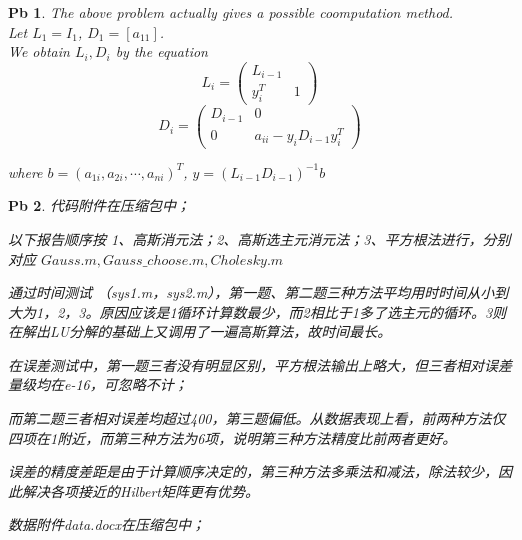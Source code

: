 \documentclass[a4paper,10pt]{article}
\newtheorem{num}{Pb}
\begin{document}
\begin{num}
    The above problem actually gives a possible coomputation method.\\
    Let  $ L_1=I_1 $, $ D_1=[a_{11}] $.\\
    We obtain  $ L_i,D_i $ by the equation 
    \[
        L_i=\begin{pmatrix}
            L_{i-1}&\\
            y_i^T&1
        \end{pmatrix}
    \]   
    \begin{equation*}
        D_i=\begin{pmatrix}
            D_{i-1}&0\\0&a_{ii}-y_iD_{i-1}y_i^T
        \end{pmatrix}
    \end{equation*}

    where  $  b=(a_{1i},a_{2i},\cdots,a_{ni})^T $, $ y=(L_{i-1}D_{i-1})^{-1}b $  
\end{num}
\begin{num}
    代码附件在压缩包中；
    
    
    以下报告顺序按 1、高斯消元法；2、高斯选主元消元法；3、平方根法进行，分别对应
    $  Gauss.m,Gauss\_choose.m,Cholesky.m $ 
    
    
    通过时间测试 （sys1.m，sys2.m），第一题、第二题三种方法平均用时时间从小到大为1，2，3。原因应该是1循环计算数最少，而2相比于1多了选主元的循环。3则在解出LU分解的基础上又调用了一遍高斯算法，故时间最长。

    
    在误差测试中，第一题三者没有明显区别，平方根法输出上略大，但三者相对误差量级均在e-16，可忽略不计；

    
    而第二题三者相对误差均超过400，第三题偏低。从数据表现上看，前两种方法仅四项在1附近，而第三种方法为6项，说明第三种方法精度比前两者更好。

    
    误差的精度差距是由于计算顺序决定的，第三种方法多乘法和减法，除法较少，因此解决各项接近的Hilbert矩阵更有优势。
    
    数据附件data.docx在压缩包中；

    
\end{num}
\end{document}
